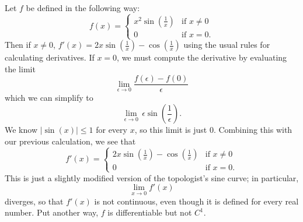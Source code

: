 \documentclass[12pt]{article}
\begin{document}
Let $f$ be defined in the following way:
\[
f(x)=\begin{cases}
x^2\sin\left(\frac{1}{x}\right) & \text{if }x\neq 0\\
0 & \text{if }x=0.
\end{cases}
\]
Then if $x\neq 0$, $f'(x)=2x\sin\left(\frac{1}{x}\right) - \cos\left(\frac{1}{x}\right)$ using the usual rules for calculating derivatives.  If $x=0$, we must compute the derivative by evaluating the limit
\[
\lim_{\epsilon\to 0} \frac{f(\epsilon)-f(0)}{\epsilon}
\]
which we can simplify to 
\[
\lim_{\epsilon\to 0} \, \epsilon\sin\left(\frac{1}{\epsilon}\right).
\]
We know $\left|\sin(x)\right|\leq 1$ for every $x$, so this limit is just $0$.  Combining this with our previous calculation, we see that
\[
f'(x)=\begin{cases}
2x\sin\left(\frac{1}{x}\right) - \cos\left(\frac{1}{x}\right) & \text{if }x\neq 0 \\
0 & \text{if }x=0.
\end{cases}
\]
This is just a slightly modified version of the topologist's sine curve; in particular,
\[
\lim_{x\to 0} f'(x)
\]
diverges, so that $f'(x)$ is not continuous, even though it is defined for every real number.  Put another way, $f$ is differentiable but not $C^1$.
\end{document}
